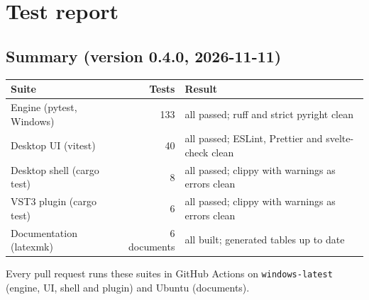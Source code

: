\documentclass{covermaker}
\begin{document}
\chapter{Test report}
\section{Summary (version 0.4.0, 2026-11-11)}
\begin{tabularx}{\linewidth}{@{}lrY@{}}
\toprule
\textbf{Suite} & \textbf{Tests} & \textbf{Result} \\
\midrule
Engine (pytest, Windows) & 133 & all passed; ruff and strict pyright clean \\
Desktop UI (vitest) & 40 & all passed; ESLint, Prettier and svelte-check clean \\
Desktop shell (cargo test) & 8 & all passed; clippy with warnings as errors clean \\
VST3 plugin (cargo test) & 6 & all passed; clippy with warnings as errors clean \\
Documentation (latexmk) & 6 documents & all built; generated tables up to date \\
\bottomrule
\end{tabularx}

\noindent Every pull request runs these suites in GitHub Actions on
\texttt{windows-latest} (engine, UI, shell and plugin) and Ubuntu (documents).
\end{document}

